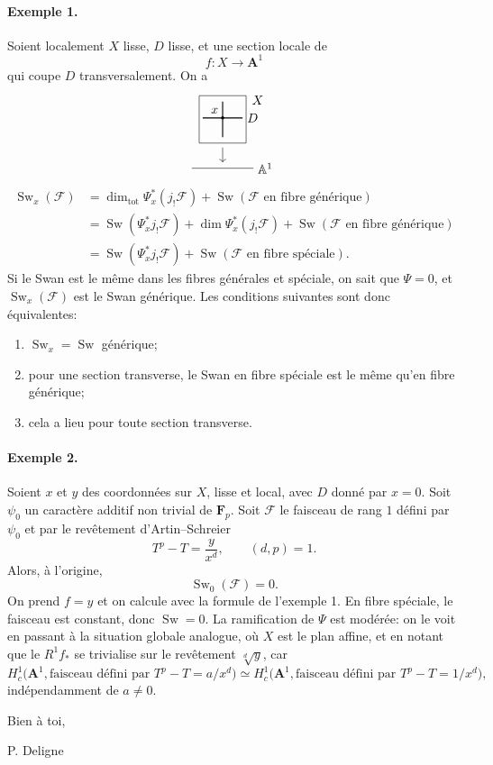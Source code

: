 \documentclass[11pt]{article}
\newcommand{\familySquareSketch}{%
\begin{tikzpicture}[scale=.82,baseline=-.5ex]
  \draw (0,0) rectangle (1.6,1.6);
  \draw[thick] (.12,.85) -- (1.48,.85) node[right]{$D$};
  \draw[thick] (.8,.2) -- (.8,1.4);
  \fill (.8,.85) circle (1.5pt) node[above left]{$x$};
  \draw[->] (.8,-.15) -- (.8,-.65);
  \draw (-.25,-.85) -- (1.85,-.85) node[right]{$\mathbb A^1$};
  \node[right] at (1.65,1.45){$X$};
\end{tikzpicture}%
}
\newcommand{\F}{\mathcal F}
\newcommand{\Fp}{\mathbf F_p}
\newcommand{\A}{\mathbf A}
\DeclareMathOperator{\Sw}{Sw}
\DeclareMathOperator{\Tot}{tot}
\begin{document}
\paragraph{Exemple 1.}
Soient localement \(X\) lisse, \(D\) lisse, et une section locale de
\[
  f:X\longrightarrow \A^1
\]
qui coupe \(D\) transversalement. On a
\[
\familySquareSketch
\]
\[
\begin{aligned}
\Sw_x(\F)
&=\dim_{\Tot}\Psi_x^*(j_!\F)
  +\Sw(\F\text{ en fibre générique}) \\
&=\Sw(\Psi_x^*j_!\F)
  +\dim\Psi_x^*(j_!\F)
  +\Sw(\F\text{ en fibre générique}) \\
&=\Sw(\Psi_x^*j_!\F)+\Sw(\F\text{ en fibre spéciale}).
\end{aligned}
\]
Si le Swan est le même dans les fibres générales et spéciale, on sait que \(\Psi=0\), et \(\Sw_x(\F)\) est le Swan générique. Les conditions suivantes sont donc équivalentes:
\begin{enumerate}[label=(\roman*)]
\item \(\Sw_x=\Sw\) générique;
\item pour une section transverse, le Swan en fibre spéciale est le même qu'en fibre générique;
\item cela a lieu pour toute section transverse.
\end{enumerate}

\paragraph{Exemple 2.}
Soient \(x\) et \(y\) des coordonnées sur \(X\), lisse et local, avec \(D\) donné par \(x=0\). Soit \(\psi_0\) un caractère additif non trivial de \(\Fp\). Soit \(\F\) le faisceau de rang \(1\) défini par \(\psi_0\) et par le revêtement d'Artin--Schreier
\[
  T^p-T=\frac{y}{x^d},
  \qquad (d,p)=1.
\]
Alors, à l'origine,
\[
  \Sw_0(\F)=0.
\]
On prend \(f=y\) et on calcule avec la formule de l'exemple 1. En fibre spéciale, le faisceau est constant, donc \(\Sw=0\). La ramification de \(\Psi\) est modérée: on le voit en passant à la situation globale analogue, où \(X\) est le plan affine, et en notant que le \(R^1f_*\) se trivialise sur le revêtement \(\sqrt[d]{y}\), car
\[
 H_c^1\bigl(\A^1,\text{faisceau défini par }T^p-T=a/x^d\bigr)
 \simeq
 H_c^1\bigl(\A^1,\text{faisceau défini par }T^p-T=1/x^d\bigr),
\]
indépendamment de \(a\ne 0\).

Bien à toi,

\hspace{2em}P. Deligne
\end{document}
